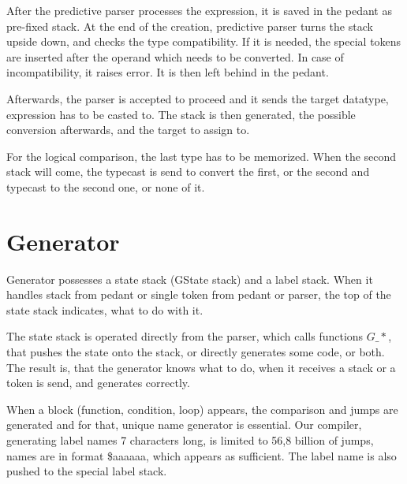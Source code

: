 \documentclass[12pt,a4paper,titlepage]{report}
\begin{document}
\begin{justify}
After the predictive parser processes the expression, it is saved in the pedant
 as pre-fixed stack. At the end of the creation, predictive parser turns the
 stack upside down, and checks the type compatibility. If it is needed, the
 special tokens are inserted after the operand which needs to be converted.
 In case of incompatibility, it raises error. It is then left behind in the
 pedant.
\end{justify}

\begin{justify}
Afterwards, the parser is accepted to proceed and it sends the target datatype,
expression has to be casted to. The stack is then generated, the possible
conversion afterwards, and the target to assign to.
\end{justify}

\begin{justify}
For the logical comparison, the last type has to be memorized.
When the second stack will come, the typecast is send to convert the first,
or the second and typecast to the second one, or none of it.
\end{justify}

\section{Generator}
\begin{justify}
Generator possesses a state stack (GState stack) and a label stack.
When it handles stack from pedant or single token from pedant or parser,
the top of the state stack indicates, what to do with it.
\end{justify}

\begin{justify}
The state stack is operated directly from the parser, which calls functions
$G\_*$, that pushes the state onto the stack, or directly generates some code,
or both. The result is, that the generator knows what to do, when it receives a
stack or a token is send, and generates correctly.
\end{justify}

\begin{justify}
When a block (function, condition, loop) appears, the comparison and jumps
are generated and for that, unique name generator is essential. Our compiler,
generating label names 7 characters long, is limited to 56,8 billion of jumps,
names are in format \$aaaaaa, which appears as sufficient. The label name is also
pushed to the special label stack.
\end{justify}
\end{document}
